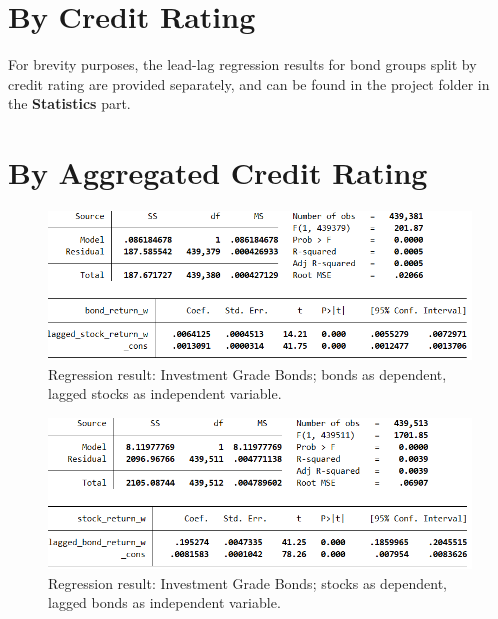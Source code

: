 \section{By Credit Rating}
For brevity purposes, the lead-lag regression results for bond groups split by credit rating are provided separately, and can be found in the project folder in the \textbf{Statistics} part.

\section{By Aggregated Credit Rating}
\begin{figure}[h!]
	\centering
	\includegraphics[width=1.0\linewidth]{figures/regression-results/regression-investment-grade-bonds-as-dependent.PNG}
	\caption{Regression result: Investment Grade Bonds; bonds as dependent, lagged stocks as independent variable. }
	\label{fig:regression-investment-grade-bonds-as-dependent}
\end{figure}

\begin{figure}[h!]
	\centering
	\includegraphics[width=1.0\linewidth]{figures/regression-results/regression-investment-grade-stocks-as-dependent.PNG}
	\caption{Regression result: Investment Grade Bonds; stocks as dependent, lagged bonds as independent variable. }
	\label{fig:regression-investment-grade-stocks-as-dependent}
\end{figure}

